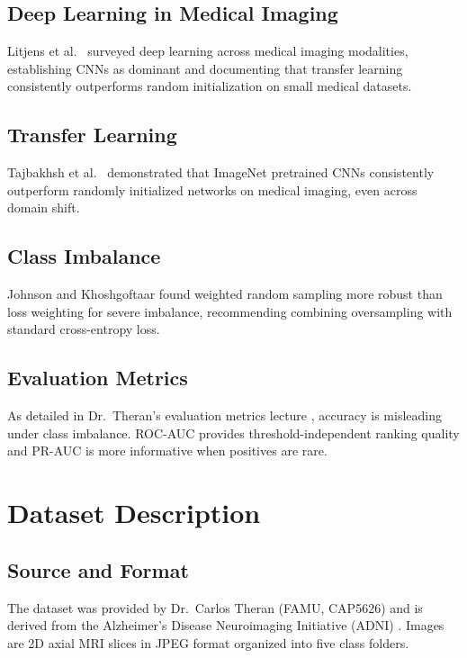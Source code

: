 \documentclass[12pt, a4paper]{article}
\begin{document}
\subsection{Deep Learning in Medical Imaging}
Litjens et al.\ \cite{litjens2017} surveyed deep learning
across medical imaging modalities, establishing CNNs as
dominant and documenting that transfer learning consistently
outperforms random initialization on small medical datasets.

\subsection{Transfer Learning}
Tajbakhsh et al.\ \cite{tajbakhsh2016} demonstrated that
ImageNet pretrained CNNs consistently outperform randomly
initialized networks on medical imaging, even across domain
shift.

\subsection{Class Imbalance}
Johnson and Khoshgoftaar \cite{johnson2019} found weighted
random sampling more robust than loss weighting for severe
imbalance, recommending combining oversampling with standard
cross-entropy loss.

\subsection{Evaluation Metrics}
As detailed in Dr.\ Theran's evaluation metrics lecture
\cite{theran2026metrics}, accuracy is misleading under class
imbalance. ROC-AUC provides threshold-independent ranking
quality and PR-AUC is more informative when positives are
rare.

\section{Dataset Description}

\subsection{Source and Format}
The dataset was provided by Dr.\ Carlos Theran (FAMU,
CAP5626) and is derived from the Alzheimer's Disease
Neuroimaging Initiative (ADNI) \cite{lim2022}. Images are
2D axial MRI slices in JPEG format organized into five class
folders.
\end{document}
